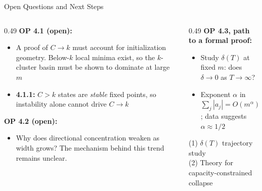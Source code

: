\documentclass[aspectratio=169, 10pt]{beamer}
\begin{document}
\begin{frame}{Open Questions and Next Steps}
  \begin{columns}[T]
    \begin{column}{0.49\textwidth}
      \small
      \textbf{OP 4.1 (open):}
      \begin{itemize}
        \item A proof of $C \to k$ must account for
              initialization geometry. Below-$k$ local minima
              exist, so the $k$-cluster basin must be shown
              to dominate at large $m$
        \item \textbf{4.1.1:} $C > k$ states are \emph{stable}
              fixed points, so instability alone cannot drive $C \to k$
      \end{itemize}

      \vspace{0.4em}
      \textbf{OP 4.2 (open):}
      \begin{itemize}
        \item Why does directional concentration weaken as width grows?
              The mechanism behind this trend remains unclear.
      \end{itemize}
    \end{column}
    \begin{column}{0.49\textwidth}
      \small
      \textbf{OP 4.3, path to a formal proof:}
      \begin{itemize}
        \item Study $\delta(T)$ at fixed $m$:
              does $\delta \to 0$ as $T \to \infty$?
        \item Exponent $\alpha$ in
              $\sum_j|a_j| = O(m^\alpha)$;
              data suggests $\alpha \approx 1/2$
      \end{itemize}

      \vspace{0.4em}
      \begin{tcolorbox}[slideboxA, title={Immediate priorities}]
        \small
        (1) $\delta(T)$ trajectory study\\
        (2) Theory for capacity-constrained collapse
      \end{tcolorbox}
    \end{column}
  \end{columns}
\end{frame}
\end{document}
